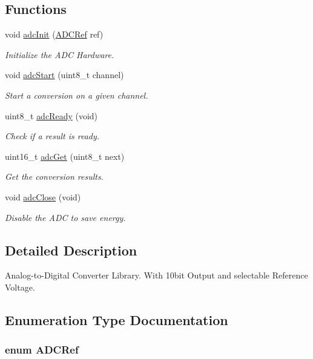 \subsection*{Functions}
\begin{DoxyCompactItemize}
\item 
void \hyperlink{group__adc_ga658c8b976878603187b79166345319e0}{adc\-Init} (\hyperlink{group__adc_ga7fc3dc0de11790b4393b4be70d79a02f}{A\-D\-C\-Ref} ref)
\begin{DoxyCompactList}\small\item\em Initialize the A\-D\-C Hardware. \end{DoxyCompactList}\item 
void \hyperlink{group__adc_ga709f0e604f22040ae61dc7710f0adee5}{adc\-Start} (uint8\-\_\-t channel)
\begin{DoxyCompactList}\small\item\em Start a conversion on a given channel. \end{DoxyCompactList}\item 
uint8\-\_\-t \hyperlink{group__adc_gaf80150a2f4a38efa40fe1c314b6995ef}{adc\-Ready} (void)
\begin{DoxyCompactList}\small\item\em Check if a result is ready. \end{DoxyCompactList}\item 
uint16\-\_\-t \hyperlink{group__adc_ga50d95c156a0eaea87bd65f5abfc1b5cb}{adc\-Get} (uint8\-\_\-t next)
\begin{DoxyCompactList}\small\item\em Get the conversion results. \end{DoxyCompactList}\item 
void \hyperlink{group__adc_ga60d979fb3eb0c7cc9da721671ad7f2bc}{adc\-Close} (void)
\begin{DoxyCompactList}\small\item\em Disable the A\-D\-C to save energy. \end{DoxyCompactList}\end{DoxyCompactItemize}


\subsection{Detailed Description}
Analog-\/to-\/\-Digital Converter Library. With 10bit Output and selectable Reference Voltage. 

\subsection{Enumeration Type Documentation}
\hypertarget{group__adc_ga7fc3dc0de11790b4393b4be70d79a02f}{
\subsubsection[{A\-D\-C\-Ref}]{\setlength{\rightskip}{0pt plus 5cm}enum {\bf A\-D\-C\-Ref}}}\label{group__adc_ga7fc3dc0de11790b4393b4be70d79a02f}


